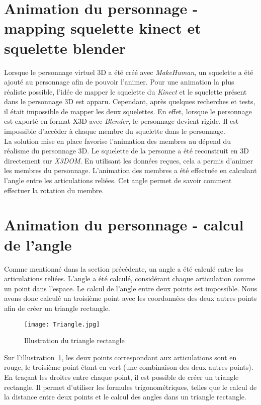 \section*{Animation du personnage - mapping squelette kinect et squelette blender}  \label{probSquelette}

Lorsque le personnage virtuel 3D a été créé avec \textit{MakeHuman}, un squelette a été ajouté au personnage afin de pouvoir l'animer. Pour une animation la plus réaliste possible, l'idée de mapper le squelette du \textit{Kinect} et le squelette présent dans le personnage 3D est apparu. Cependant, après quelques recherches et tests, il était impossible de mapper les deux squelettes. En effet, lorsque le personnage est exporté en format X3D avec \textit{Blender}, le personnage devient rigide. Il est impossible d'accéder à chaque membre du squelette dans le personnage.\\

La solution mise en place favorise l'animation des membres au dépend du réalisme du personnage 3D. Le squelette de la personne a été reconstruit en 3D directement sur \textit{X3DOM}. En utilisant les données reçues, cela a permis d'animer les membres du personnage. L'animation des membres a été effectuée en calculant l'angle entre les articulations reliées. Cet angle permet de savoir comment effectuer la rotation du membre.


\section*{Animation du personnage - calcul de l'angle}  \label{probAngle}

Comme mentionné dans la section précédente, un angle a été calculé entre les articulations reliées. L'angle a été calculé, considérant chaque articulation comme un point dans l'espace. Le calcul de l'angle entre deux points est impossible. Nous avons donc calculé un troisième point avec les coordonnées des deux autres points afin de créer un triangle rectangle.\\

\begin{figure}[H]
	\centering
   		\texttt{[image: Triangle.jpg]}
   \caption{\label{triangle rectangle} Illustration du triangle rectangle}
\end{figure}
Sur l'illustration~\ref{triangle rectangle}, les deux points correspondant aux articulations sont en rouge, le troisième point étant en vert (une combinaison des deux autres points). En traçant les droites entre chaque point, il est possible de créer un triangle rectangle. Il permet d'utiliser les formules trigonométriques, telles que le calcul de la distance entre deux points et le calcul des angles dans un triangle rectangle. \\

